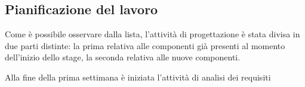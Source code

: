 \subsection{Pianificazione del lavoro}
%
%
%
%
%

Come è possibile osservare dalla lista, l'attività di progettazione è stata divisa in due parti distinte:  la prima relativa alle  componenti già presenti al momento dell'inizio dello stage, la seconda relativa alle nuove componenti.
% 



Alla fine della prima settimana è iniziata l'attività di analisi dei requisiti
